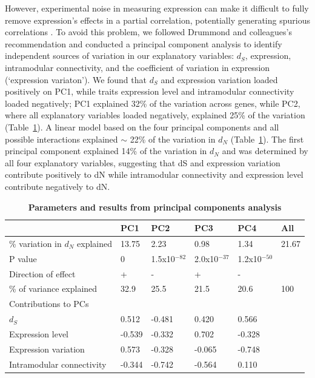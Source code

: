 However, experimental noise in measuring expression can make it difficult to fully remove expression’s effects in a partial correlation, potentially generating spurious correlations \citep{Drummond2006-pa}. To avoid this problem, we followed Drummond and colleagues’s recommendation and conducted a principal component analysis to identify independent sources of variation in our explanatory variables: $d_{S}$, expression, intramodular connectivity, and the coefficient of variation in expression (‘expression variaton’). We found that $d_{S}$ and expression variation loaded positively  on PC1, while traits expression level and intramodular connectivity loaded negatively; PC1 explained 32\% of the variation across genes, while PC2, where all explanatory variables loaded negatively, explained 25\% of the variation (Table~\ref{table:t2}). A linear model based on the four principal components and all possible interactions explained $\sim$ 22\% of the variation in $d_{N}$ (Table~\ref{table:t2}). The first principal component explained 14\% of the variation in $d_{N}$ and was determined by all four explanatory variables, suggesting that dS and expression variation contribute positively to dN while intramodular connectivity and expression level contribute negatively to dN. 

\begin{table}[ht!]
\centering
\begin{tabular} {ll l l l l}
\hline
 &PC1 &PC2 &PC3 &PC4 &All \\ [0.5ex]
\hline
\% variation in $d_{N}$ explained & 13.75 &2.23 &0.98& 1.34 & 21.67\\
P value & 0 & 1.5x10$^{-82}$ & 2.0x10$^{-37}$ & 1.2x10$^{-50}$ &  \\
Direction of effect & + & - & + & - & \\
\% of variance explained & 32.9 &25.5 &21.5 &20.6 &100\\
\hline
Contributions to PCs & & & & & \\ [0.5ex]
$d_{S}$ & 0.512 & -0.481 & 0.420 & 0.566 & \\
Expression level & -0.539 &-0.332 &0.702 & -0.328 & \\
Expression variation &0.573 &-0.328 &-0.065 &-0.748 & \\
Intramodular connectivity &-0.344 &-0.742 &-0.564 &0.110 & \\
\hline
\end{tabular}
\caption{\textbf{Parameters and results from principal components analysis}}
\label{table:t2}
\end{table}

